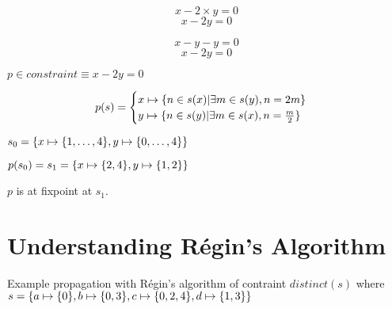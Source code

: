 \documentclass[a4paper, 11pt]{article}
\newcommand\mymapsto{\mathrel{\ooalign{$\rightarrow$\cr%
      \kern-.15ex\raise.275ex\hbox{\scalebox{1}[0.522]{$\mid$}}\cr}}}
\begin{document}
$$x - 2 \times y = 0$$
$$x - 2y = 0$$

$$x - y - y = 0$$
$$x - 2y = 0$$

$p \in constraint \equiv x - 2y = 0$

\begin{gather*}
p(s) = 
\begin{cases}
  x \mymapsto \{n \in s(x) | \exists m \in s(y), n = 2m\}\\
  y \mymapsto \{n \in s(y) | \exists m \in s(x), n = \frac{m}{2}\}\\
\end{cases}
\end{gather*}

$s_0 = \{x \mymapsto \{1, \ldots, 4\}, y \mymapsto \{0, \ldots, 4\}\}$

$p(s_0) = s_1 = \{x \mymapsto \{2,4\}, y \mymapsto \{1,2\}\}$

$p$ is at fixpoint at $s_1$.
\section*{Understanding Régin’s Algorithm}
Example propagation with Régin's algorithm of contraint $distinct(s)$ where
$s = \{a \mymapsto \{0\}, b \mymapsto \{0,3\}, c \mymapsto \{0,2,4\}, d \mymapsto \{1,3\}\}$
\end{document}
